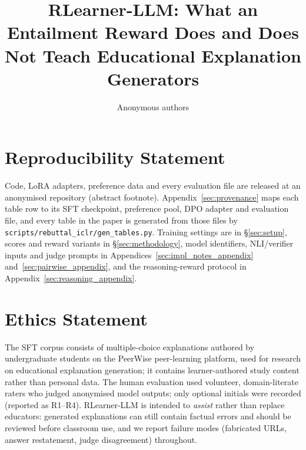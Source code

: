 \documentclass{article}
\title{RLearner-LLM: What an Entailment Reward Does and Does Not Teach Educational Explanation Generators}
\author{Anonymous authors}
\begin{document}
\maketitle










\newpage
\section*{Reproducibility Statement}
Code, LoRA adapters, preference data and every evaluation file are released at an anonymised repository (abstract footnote). Appendix~\ref{sec:provenance} maps each table row to its SFT checkpoint, preference pool, DPO adapter and evaluation file, and every table in the paper is generated from those files by \texttt{scripts/rebuttal\_iclr/gen\_tables.py}. Training settings are in \S\ref{sec:setup}, scores and reward variants in \S\ref{sec:methodology}, model identifiers, NLI/verifier inputs and judge prompts in Appendices~\ref{sec:impl_notes_appendix} and~\ref{sec:pairwise_appendix}, and the reasoning-reward protocol in Appendix~\ref{sec:reasoning_appendix}.

\section*{Ethics Statement}
The SFT corpus consists of multiple-choice explanations authored by undergraduate students on the PeerWise peer-learning platform, used for research on educational explanation generation; it contains learner-authored study content rather than personal data. The human evaluation used volunteer, domain-literate raters who judged anonymised model outputs; only optional initials were recorded (reported as R1--R4). RLearner-LLM is intended to \emph{assist} rather than replace educators: generated explanations can still contain factual errors and should be reviewed before classroom use, and we report failure modes (fabricated URLs, answer restatement, judge disagreement) throughout.




\end{document}
